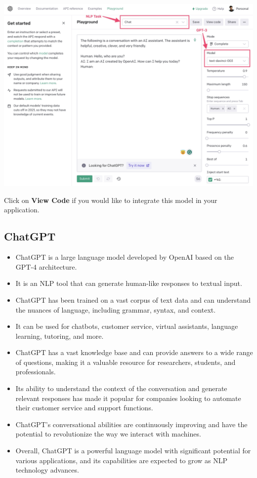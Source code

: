 \includegraphics[width=1\linewidth]{img//rnn//transformers/open_ai_playground.jpeg}

Click on \textbf{View Code} if you would like to integrate this model in your application.

\subsection{ChatGPT}

\begin{itemize}
    \item ChatGPT is a large language model developed by OpenAI based on the GPT-4 architecture.
    \item It is an NLP tool that can generate human-like responses to textual input.
    \item ChatGPT has been trained on a vast corpus of text data and can understand the nuances of language, including grammar, syntax, and context.
    \item It can be used for chatbots, customer service, virtual assistants, language learning, tutoring, and more.
    \item ChatGPT has a vast knowledge base and can provide answers to a wide range of questions, making it a valuable resource for researchers, students, and professionals.
    \item Its ability to understand the context of the conversation and generate relevant responses has made it popular for companies looking to automate their customer service and support functions.
    \item ChatGPT's conversational abilities are continuously improving and have the potential to revolutionize the way we interact with machines.
    \item Overall, ChatGPT is a powerful language model with significant potential for various applications, and its capabilities are expected to grow as NLP technology advances.
\end{itemize}
